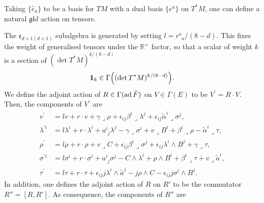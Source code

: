 \documentclass[debug]{phd}
\begin{document}
			Taking $\{\hat{e}_{a}\}$ to be a basis for $TM$ with a dual basis $\{e^{a}\}$ on $T^{*}M$, one can define a natural $\mathfrak{gl}{d}$ action on tensors.
			
			The $\mathfrak{e}_{d+1(d+1)}$ subalgebra is generated by setting $l=r_{\phantom{a}a}^{a}/(8-d)$. This fixes the weight of generalised tensors under the $\mathbb{R}^+$ factor, so that a scalar of weight $k$ is a section of $(\det T^{*}M)^{k/(8-d)}$
					\begin{equation}\label{RplusIIB}
						\mathbf{1}_k \in \Gamma\Bigl( (\det T^{*}M)^{k/(8-d)} \Bigr).
					\end{equation}
			We define the adjoint action of $R\in\Gamma(\operatorname{ad} \tilde{F})$ on $V\in \Gamma(E)$ to be $V^{\prime} =R \cdot V$. 
			Then, the components of $V^{\prime}$ are
				\begin{equation}\label{eq:IIB_adjoint}
						\begin{split}
							v^{\prime} & =lv+r\cdot v+\gamma\lrcorner\rho+\epsilon_{ij}\beta^{i}\lrcorner\lambda^{j}+\epsilon_{ij}\tilde{\alpha}^{i}\lrcorner\sigma^{j},\\
							\lambda^{\prime i} & =l\lambda^{i}+r\cdot\lambda^{i}+a_{\phantom{i}j}^{i}\lambda^{j}-\gamma\lrcorner\sigma^{i}+v\lrcorner B^{i}+\beta^{i}\lrcorner\rho-\tilde{\alpha}^{i}\lrcorner\tau,\\
							\rho^{\prime} & =l\rho+r\cdot\rho+v\lrcorner C+\epsilon_{ij}\beta^{i}\lrcorner\sigma^{j}+\epsilon_{ij}\lambda^{i}\wedge B^{j}+\gamma\lrcorner\tau,\\
							\sigma^{\prime i} & =l\sigma^{i}+r\cdot\sigma^{i}+a_{\phantom{i}j}^{i}\sigma^{j}-C\wedge\lambda^{i}+\rho\wedge B^{i}+\beta^{i}\lrcorner\tau+v\lrcorner\tilde{a}^{i},\\
							\tau^{\prime} & =l\tau+r\cdot\tau+\epsilon_{ij}j\lambda^{i}\wedge\tilde{a}^{j}-j\rho\wedge C-\epsilon_{ij}j\sigma^{i}\wedge B^{j}.
						\end{split}
					\end{equation}
			In addition, one defines the adjoint action of $R$ on $R'$ to be the commutator $R''=[R,R']$.
			As consequence, the components of $R''$ are
\end{document}
